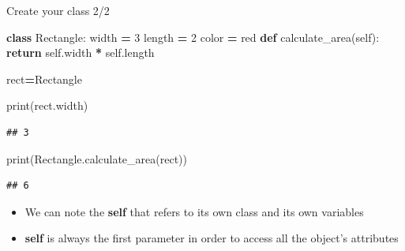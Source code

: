 \documentclass[
  8pt,
  ignorenonframetext,
]{beamer}
\newenvironment{Shaded}{\begin{snugshade}}{\end{snugshade}}
\newcommand{\BuiltInTok}[1]{#1}
\newcommand{\ControlFlowTok}[1]{\textcolor[rgb]{0.13,0.29,0.53}{\textbf{#1}}}
\newcommand{\DecValTok}[1]{\textcolor[rgb]{0.00,0.00,0.81}{#1}}
\newcommand{\KeywordTok}[1]{\textcolor[rgb]{0.13,0.29,0.53}{\textbf{#1}}}
\newcommand{\NormalTok}[1]{#1}
\newcommand{\OperatorTok}[1]{\textcolor[rgb]{0.81,0.36,0.00}{\textbf{#1}}}
\newcommand{\StringTok}[1]{\textcolor[rgb]{0.31,0.60,0.02}{#1}}
\newcommand{\VariableTok}[1]{\textcolor[rgb]{0.00,0.00,0.00}{#1}}
\begin{document}
\begin{frame}[fragile]{Create your class 2/2}
\protect\hypertarget{create-your-class-22}{}
\begin{Shaded}
\begin{Highlighting}[]
\KeywordTok{class}\NormalTok{ Rectangle:}
\NormalTok{  width }\OperatorTok{=} \DecValTok{3}
\NormalTok{  length }\OperatorTok{=} \DecValTok{2}
\NormalTok{  color }\OperatorTok{=} \StringTok{\textquotesingle{}red\textquotesingle{}}
  \KeywordTok{def}\NormalTok{ calculate\_area(}\VariableTok{self}\NormalTok{):}
      \ControlFlowTok{return} \VariableTok{self}\NormalTok{.width }\OperatorTok{*} \VariableTok{self}\NormalTok{.length}

\NormalTok{rect}\OperatorTok{=}\NormalTok{Rectangle}

\BuiltInTok{print}\NormalTok{(rect.width)}
\end{Highlighting}
\end{Shaded}

\begin{verbatim}
## 3
\end{verbatim}

\begin{Shaded}
\begin{Highlighting}[]
\BuiltInTok{print}\NormalTok{(Rectangle.calculate\_area(rect))}
\end{Highlighting}
\end{Shaded}

\begin{verbatim}
## 6
\end{verbatim}

\begin{itemize}
\item
  We can note the \textbf{self} that refers to its own class and its own
  variables
\item
  \textbf{self} is always the first parameter in order to access all the
  object's attributes
\end{itemize}
\end{frame}
\end{document}
